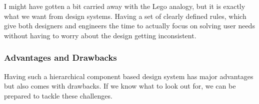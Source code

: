 I might have gotten a bit carried away with the Lego analogy, but it is exactly what we want from
design systems. Having a set of clearly defined rules, which give both designers and engineers the
time to actually focus on solving user needs without having to worry about the design getting
inconsistent. 

\subsubsection{Advantages and Drawbacks}
Having such a hierarchical component based design system has major advantages but also comes with
drawbacks. If we know what to look out for, we can be prepared to tackle these challenges. \\\\
